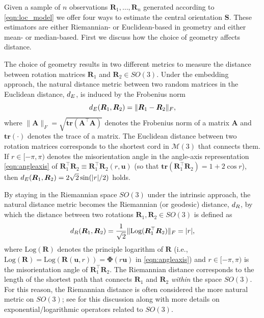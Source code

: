Given a sample of $n$ observations $\bm R_1,\dots,\bm R_{n}$ generated according to \eqref{eqn:loc_model} we offer four ways to estimate the central orientation $\bm S$.  These estimators are either Riemannian- or Euclidean-based in geometry and either mean- or median-based.  First we discuss how the choice of geometry affects distance.

The choice of geometry results in two different metrics to measure the distance between rotation matrices $\bm{R}_1$ and $\bm{R}_2 \in SO(3)$. Under the embedding approach, the natural distance metric between two random matrices in the Euclidean distance, $d_E$, is induced by the Frobenius norm 
\begin{equation}
\label{d_E}
d_E(\bm{R}_1,\bm{R}_2)=\|\bm{R}_1-\bm{R}_2\|_F, 
\end{equation}
where $\|\bm{A}\|_F = \sqrt{\mathbf{tr}({\bm A^\top \bm A})}$ denotes the Frobenius norm of a matrix $\bm A$ and $\mathbf{tr}(\cdot)$ denotes the trace of a matrix.  The Euclidean distance between two rotation matrices corresponds to the shortest cord in $\mathcal{M}(3)$ that connects them.  If $r\in[-\pi,\pi)$ denotes the misorientation angle in the angle-axis representation \eqref{eqn:angleaxis} of $\bm{R}_1^\top \bm{R}_2 \equiv \bm{R}_1^\top \bm{R}_2(r,\bm{u})$ (so that $\mathbf{tr}(\bm{R}_1^\top \bm{R}_2) =1 +2 \cos r$), then $d_E(\bm{R}_1,\bm{R}_2) = 2\sqrt{2}\sin(|r|/2)$ holds.

By staying in the Riemannian space $SO(3)$ under the intrinsic approach, the natural distance metric becomes the Riemannian (or geodesic) distance, $d_R$, by which the distance between two rotations $\bm{R}_1,\bm{R}_2\in SO(3)$  is  defined as 
\begin{equation}
\label{d_R}
d_R(\bm{R}_1,\bm{R}_2)=  \frac{1}{\sqrt{2}}\|\text{Log}(\bm{R}_1^\top\bm{R}_2)\|_F = |r|,
\end{equation}
where $\text{Log}(\bm{R})$ denotes the principle logarithm of $\bm{R}$ (i.e., $\text{Log}(\bm{R}) = \text{Log}(\bm{R}(\bm u,r))= \bm \Phi(r\bm u)$ in \eqref{eqn:angleaxis}) and $r\in[-\pi,\pi)$ is the misorientation angle of $\bm{R}_1^\top \bm{R}_2$.  The Riemannian distance corresponds to the length of the shortest path that connects $\bm{R}_1$ and $\bm{R}_2$ {\it within} the space $SO(3)$. For this reason, the Riemannian distance is often considered the more natural metric on $SO(3)$; see \citet{moakher2002} for this discussion along with more details on exponential/logarithmic operators related to $SO(3)$.

